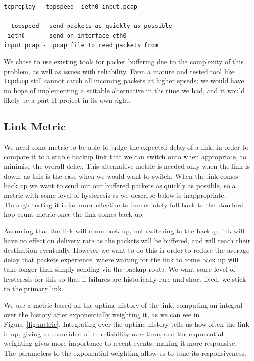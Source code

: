 \documentclass[withindex,glossary,openany]{cam-thesis}
\begin{document}
\begin{lstlisting}[label=replay_command, caption=\texttt{tcpreplay} command with explanation of arguments, frame=tb]
tcpreplay --topspeed -ieth0 input.pcap

--topspeed - send packets as quickly as possible
-ieth0     - send on interface eth0
input.pcap - .pcap file to read packets from
\end{lstlisting}

We chose to use existing tools for packet buffering due to the complexity of this problem, as well as issues with reliability. Even a mature and tested tool like \texttt{tcpdump} still cannot catch all incoming packets at higher speeds; we would have no hope of implementing a suitable alternative in the time we had, and it would likely be a part II project in its own right.

\subsection{Link Metric}

We need some metric to be able to judge the expected delay of a link, in order to compare it to a stable backup link that we can switch onto when appropriate, to minimise the overall delay. This alternative metric is needed only when the link is down, as this is the case when we would want to switch. When the link comes back up we want to send out our buffered packets as quickly as possible, so a metric with some level of hysteresis as we describe below is inappropriate. Through testing it is far more effective to immediately fall back to the standard hop-count metric once the link comes back up.

Assuming that the link will come back up, not switching to the backup link will have no effect on delivery rate as the packets will be buffered, and will reach their destination eventually. However we want to do this in order to reduce the average delay that packets experience, where waiting for the link to come back up will take longer than simply sending via the backup route. We want some level of hysteresis for this so that if failures are historically rare and short-lived, we stick to the primary link.

We use a metric based on the uptime history of the link, computing an integral over the history after exponentially weighting it, as we can see in Figure~\ref{fig:metric}. Integrating over the uptime history tells us how often the link is up, giving us some idea of its reliability over time, and the exponential weighting gives more importance to recent events, making it more responsive. The parameters to the exponential weighting allow us to tune its responsiveness.
\end{document}
